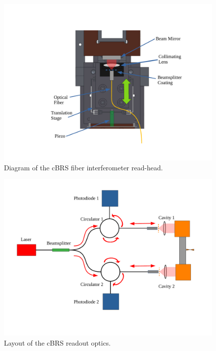 \documentclass [12pt, proquest]{uwthesis}[2019]
\begin{document}
\begin{figure}[!h]
\begin{center}
\includegraphics[width=\textwidth]{cBRSOptics.pdf}
\end{center}
\caption[Diagram of the cBRS fiber interferometer read-head]{Diagram of the cBRS fiber interferometer read-head.}
\label{cBRSOpt}
\end{figure}

\begin{figure}[!h]
\begin{center}
\includegraphics[width=\textwidth]{cBRS_OpticalLayout.pdf}
\end{center}
\caption[Layout of the cBRS readout optics]{Layout of the cBRS readout optics.}
\label{cBRSOptLay}
\end{figure}
\end{document}
